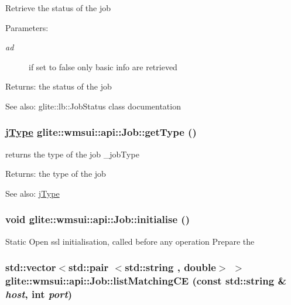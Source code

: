 Retrieve the status of the job \begin{Desc}
\item[Parameters:]
\begin{description}
\item[{\em ad}]if set to false only basic info are retrieved \end{description}
\end{Desc}
\begin{Desc}
\item[Returns:]the status of the job \end{Desc}
\begin{Desc}
\item[See also:]glite::lb::Job\-Status class documentation \end{Desc}
\hypertarget{classglite_1_1wmsui_1_1api_1_1Job_z17_8}{
\subsubsection[getType]{\setlength{\rightskip}{0pt plus 5cm}\hyperlink{namespaceglite_1_1wmsui_1_1api_a31}{j\-Type} glite::wmsui::api::Job::get\-Type ()}}
\label{classglite_1_1wmsui_1_1api_1_1Job_z17_8}


returns the type of the job \_\-job\-Type \begin{Desc}
\item[Returns:]the type of the job \end{Desc}
\begin{Desc}
\item[See also:]\hyperlink{namespaceglite_1_1wmsui_1_1api_a31}{j\-Type}\end{Desc}
\hypertarget{classglite_1_1wmsui_1_1api_1_1Job_z15_6}{
\subsubsection[initialise]{\setlength{\rightskip}{0pt plus 5cm}void glite::wmsui::api::Job::initialise ()}}
\label{classglite_1_1wmsui_1_1api_1_1Job_z15_6}


Static Open ssl initialisation, called before any operation Prepare the\hypertarget{classglite_1_1wmsui_1_1api_1_1Job_z23_2}{
\subsubsection[listMatchingCE]{\setlength{\rightskip}{0pt plus 5cm}std::vector$<$std::pair $<$std::string , double$>$ $>$ glite::wmsui::api::Job::list\-Matching\-CE (const std::string \& {\em host}, int {\em port})}}
\label{classglite_1_1wmsui_1_1api_1_1Job_z23_2}


